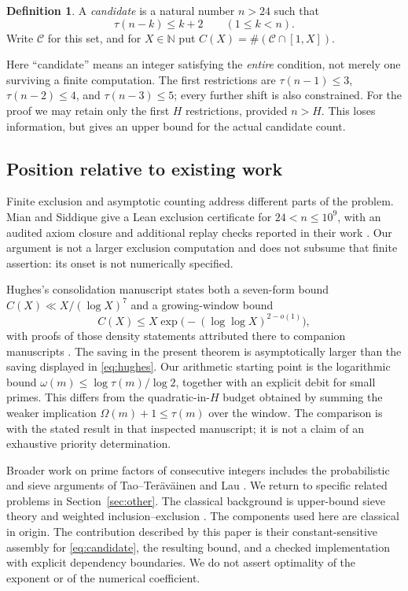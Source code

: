 \documentclass[11pt,a4paper]{article}
\theoremstyle{definition}
\newtheorem{definition}[theorem]{Definition}
\theoremstyle{remark}
\numberwithin{equation}{section}
\newcommand{\N}{\mathbb N}
\newcommand{\Cand}{\mathcal C}
\begin{document}
\begin{definition}\label{def:candidate}
A \emph{candidate} is a natural number $n>24$ such that
\begin{equation}\label{eq:candidate}
 \tau(n-k)\le k+2\qquad(1\le k<n).
\end{equation}
Write $\Cand$ for this set, and for $X\in\N$ put
$C(X)=\#(\Cand\cap[1,X])$.
\end{definition}
Here ``candidate'' means an integer satisfying the \emph{entire} condition,
not merely one surviving a finite computation. The first restrictions are
$\tau(n-1)\le3$, $\tau(n-2)\le4$, and $\tau(n-3)\le5$; every further shift is
also constrained. For the proof we may retain only the first $H$ restrictions,
provided $n>H$. This loses information, but gives an upper bound for the actual
candidate count.

\subsection{Position relative to existing work}
Finite exclusion and asymptotic counting address different parts of the problem.
Mian and Siddique give a Lean exclusion certificate for
$24<n\le10^9$, with an audited axiom closure and additional replay checks
reported in their work \citep{MianSiddique2026}. Our argument is not a larger
exclusion computation and does not subsume that finite assertion: its onset is
not numerically specified.

Hughes's consolidation manuscript states both a seven-form bound
$C(X)\ll X/(\log X)^7$ and a growing-window bound
\begin{equation}\label{eq:hughes}
 C(X)\le X\exp\!\bigl(- (\log\log X)^{2-o(1)}\bigr),
\end{equation}
with proofs of those density statements attributed there to companion
manuscripts \citep{Hughes2026}. The saving in the present theorem is
asymptotically larger than the saving displayed in \eqref{eq:hughes}.
Our arithmetic starting point is the logarithmic bound
$\omega(m)\le\log\tau(m)/\log2$, together with an explicit debit for small
primes. This differs from the quadratic-in-$H$ budget obtained by summing the
weaker implication $\Omega(m)+1\le\tau(m)$ over the window.
The comparison is with the stated result in that inspected manuscript; it is
not a claim of an exhaustive priority determination.

Broader work on prime factors of consecutive integers includes the probabilistic
and sieve arguments of Tao--Ter\"av\"ainen and Lau
\citep{TaoTeravainen2026,Lau2026}. We return to specific related problems in
Section~\ref{sec:other}. The classical background is upper-bound sieve theory
and weighted inclusion--exclusion \citep{FriedlanderIwaniec2010,GalambosSimonelli1996}.
The components used here are classical in origin. The contribution described
by this paper is their constant-sensitive assembly for \eqref{eq:candidate},
the resulting bound, and a checked implementation with explicit dependency
boundaries. We do not assert optimality of the exponent or of the numerical
coefficient.
\end{document}
